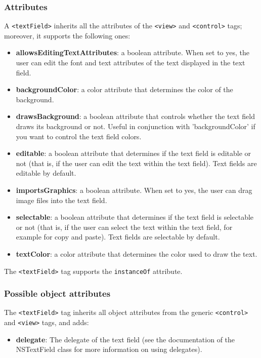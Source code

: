 \subsubsection{Attributes}
A \texttt{<textField>} inherits all the attributes of the
\texttt{<view>} and \texttt{<control>} tags; moreover, it supports the
following ones:
\begin{itemize}
\item {\bf allowsEditingTextAttributes}: a boolean attribute.  When
  set to yes, the user can edit the font and text attributes of the
  text displayed in the text field.
\item {\bf backgroundColor}: a color attribute that determines the
  color of the background.
\item {\bf drawsBackground}: a boolean attribute that controls whether
  the text field draws its background or not.  Useful in conjunction
  with 'backgroundColor' if you want to control the text field colors.
\item {\bf editable}: a boolean attribute that determines if the text
  field is editable or not (that is, if the user can edit the text
  within the text field).  Text fields are editable by default.
\item {\bf importsGraphics}: a boolean attribute.  When set to yes,
  the user can drag image files into the text field.
\item {\bf selectable}: a boolean attribute that determines if the
  text field is selectable or not (that is, if the user can select the
  text within the text field, for example for copy and paste).  Text
  fields are selectable by default.
\item {\bf textColor}: a color attribute that determines the color
  used to draw the text.
\end{itemize}

The \texttt{<textField>} tag supports the \texttt{instanceOf} attribute.

\subsubsection{Possible object attributes}
The \texttt{<textField>} tag inherits all object attributes from the
generic \texttt{<control>} and \texttt{<view>} tags, and adds:
\begin{itemize}
\item {\bf delegate}: The delegate of the text field (see the
  documentation of the NSTextField class for more information on using
  delegates).
\end{itemize}

